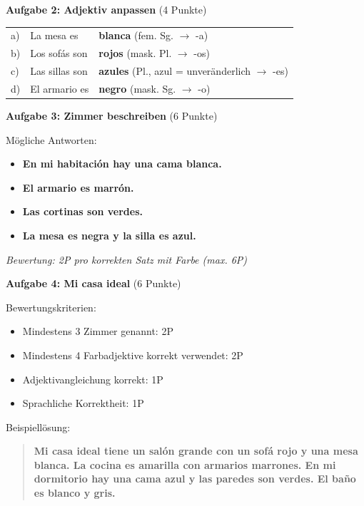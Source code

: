 \documentclass[11pt, a4paper]{article}
\newcommand{\loesung}[1]{\textcolor{loesung}{\textbf{#1}}}
\begin{document}
\vspace{1em}

\textbf{Aufgabe 2: Adjektiv anpassen} (4 Punkte)

\begin{tabular}{lll}
a) & La mesa es & \loesung{blanca} (fem. Sg. $\rightarrow$ -a) \\
b) & Los sofás son & \loesung{rojos} (mask. Pl. $\rightarrow$ -os) \\
c) & Las sillas son & \loesung{azules} (Pl., azul = unveränderlich $\rightarrow$ -es) \\
d) & El armario es & \loesung{negro} (mask. Sg. $\rightarrow$ -o) \\
\end{tabular}

\vspace{1em}

\textbf{Aufgabe 3: Zimmer beschreiben} (6 Punkte)

Mögliche Antworten:
\begin{itemize}
    \item \loesung{En mi habitación hay una cama blanca.}
    \item \loesung{El armario es marrón.}
    \item \loesung{Las cortinas son verdes.}
    \item \loesung{La mesa es negra y la silla es azul.}
\end{itemize}

\textit{Bewertung: 2P pro korrekten Satz mit Farbe (max. 6P)}

\vspace{1em}

\textbf{Aufgabe 4: Mi casa ideal} (6 Punkte)

Bewertungskriterien:
\begin{itemize}
    \item Mindestens 3 Zimmer genannt: 2P
    \item Mindestens 4 Farbadjektive korrekt verwendet: 2P
    \item Adjektivangleichung korrekt: 1P
    \item Sprachliche Korrektheit: 1P
\end{itemize}

Beispiellösung:
\begin{quote}
\loesung{Mi casa ideal tiene un salón grande con un sofá rojo y una mesa blanca. La cocina es amarilla con armarios marrones. En mi dormitorio hay una cama azul y las paredes son verdes. El baño es blanco y gris.}
\end{quote}
\end{document}

